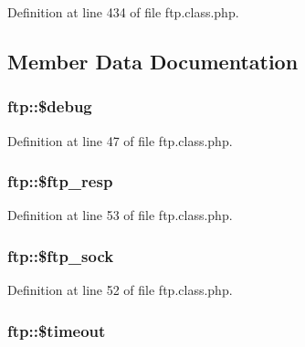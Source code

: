 Definition at line 434 of file ftp.\+class.\+php.



\subsection{Member Data Documentation}
\subsubsection[{\texorpdfstring{\$debug}{$debug}}]{\setlength{\rightskip}{0pt plus 5cm}ftp\+::\$debug}\hypertarget{classftp_a757e4db04d53816db79f117809ffbad2}{}\label{classftp_a757e4db04d53816db79f117809ffbad2}


Definition at line 47 of file ftp.\+class.\+php.

\subsubsection[{\texorpdfstring{\$ftp\+\_\+resp}{$ftp_resp}}]{\setlength{\rightskip}{0pt plus 5cm}ftp\+::\$ftp\+\_\+resp}\hypertarget{classftp_a2bc470fe4d815181c723061b1d2ad824}{}\label{classftp_a2bc470fe4d815181c723061b1d2ad824}


Definition at line 53 of file ftp.\+class.\+php.

\subsubsection[{\texorpdfstring{\$ftp\+\_\+sock}{$ftp_sock}}]{\setlength{\rightskip}{0pt plus 5cm}ftp\+::\$ftp\+\_\+sock}\hypertarget{classftp_a3beffe299e11edfce6ffe4608c2f5dc8}{}\label{classftp_a3beffe299e11edfce6ffe4608c2f5dc8}


Definition at line 52 of file ftp.\+class.\+php.

\subsubsection[{\texorpdfstring{\$timeout}{$timeout}}]{\setlength{\rightskip}{0pt plus 5cm}ftp\+::\$timeout}\hypertarget{classftp_a219848d21bf555048933e205c270b530}{}\label{classftp_a219848d21bf555048933e205c270b530}



